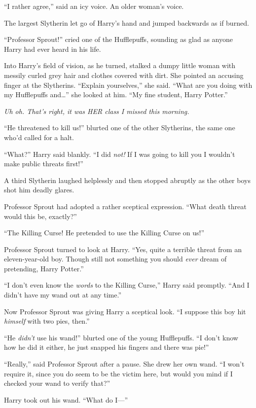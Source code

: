 ``I rather agree,'' said an icy voice. An older woman's voice.

The largest Slytherin let go of Harry's hand and jumped backwards as if
burned.

``Professor Sprout!'' cried one of the Hufflepuffs, sounding as glad as
anyone Harry had ever heard in his life.

Into Harry's field of vision, as he turned, stalked a dumpy little woman
with messily curled grey hair and clothes covered with dirt. She pointed
an accusing finger at the Slytherins. ``Explain yourselves,'' she said.
``What are you doing with my Hufflepuffs and\ldots{}'' she looked at
him. ``My fine student, Harry Potter.''

\emph{Uh oh. That's right, it was HER class I missed this morning.}

``He threatened to kill us!'' blurted one of the other Slytherins, the
same one who'd called for a halt.

``What?'' Harry said blankly. ``I did \emph{not!} If I was going to kill
you I wouldn't make public threats first!''

A third Slytherin laughed helplessly and then stopped abruptly as the
other boys shot him deadly glares.

Professor Sprout had adopted a rather sceptical expression. ``What death
threat would this be, exactly?''

``The Killing Curse! He pretended to use the Killing Curse on us!''

Professor Sprout turned to look at Harry. ``Yes, quite a terrible threat
from an eleven-year-old boy. Though still not something you should
\emph{ever} dream of pretending, Harry Potter.''

``I don't even know the \emph{words} to the Killing Curse,'' Harry said
promptly. ``And I didn't have my wand out at any time.''

Now Professor Sprout was giving Harry a sceptical look. ``I suppose this
boy hit \emph{himself} with two pies, then.''

``He \emph{didn't} use his wand!'' blurted one of the young Hufflepuffs.
``I don't know how he did it either, he just snapped his fingers and
there was pie!''

``Really,'' said Professor Sprout after a pause. She drew her own wand.
``I won't require it, since you do seem to be the victim here, but would
you mind if I checked your wand to verify that?''

Harry took out his wand. ``What do I---''

